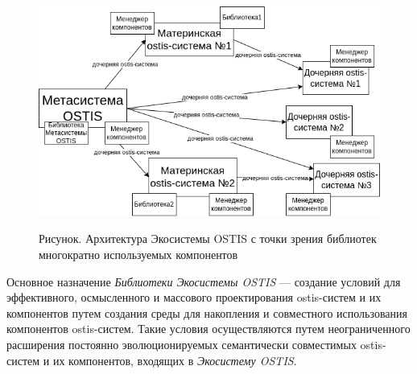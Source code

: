 \begin{figure}[H]
	\caption{Рисунок. Архитектура Экосистемы OSTIS с точки зрения библиотек многократно используемых компонентов}
	\includegraphics[scale=0.75]{author/part5/figures/ecosystem_architecture.png}
	\label{fig:ecosystem_architecture}
\end{figure}

Основное назначение \textit{Библиотеки Экосистемы OSTIS} --- создание условий для эффективного, осмысленного и массового проектирования ostis-систем и их компонентов путем создания среды для накопления и совместного использования компонентов ostis-систем. Такие условия осуществляются путем неограниченного расширения постоянно эволюционируемых семантически совместимых ostis-систем и их компонентов, входящих в \textit{Экосистему OSTIS}.

